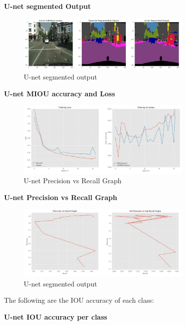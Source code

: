 \documentclass{IEEEtran}
\begin{document}
\textbf{U-net segmented Output}

\begin{figure}[h]
    \centering
    \captionsetup{justification=centering}
    \includegraphics[width=8.5cm]{U-net-cityscrapes-B16-im.JPG}
    \caption{U-net segmented output}
    \label{fig:Binary class segmented output}
\end{figure}


\textbf{U-net MIOU accuracy and Loss}

\begin{figure}[h]
    \centering
    \captionsetup{justification=centering}
    \includegraphics[width=8.5cm]{U-net-cityscrapes-B16-gr.JPG}
    \caption{U-net Precision vs Recall Graph}
    \label{fig:Binary class segmented output}
\end{figure}

\textbf{U-net Precision vs Recall Graph}

\begin{figure}[h]
    \centering
    \captionsetup{justification=centering}
    \includegraphics[width=8.5cm]{U-net-cityscrapes-B16-p-vs-re.JPG}
    \caption{U-net segmented output}
    \label{fig:Binary class segmented output}
\end{figure}

\newpage
The following are the IOU accuracy of each class:

\textbf{U-net IOU accuracy per class}
\end{document}
